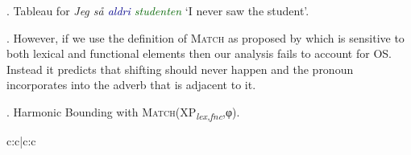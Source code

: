\documentclass[12pt, letterpaper]{article}
\begin{document}
\ex. \label{ex:noshifting} Tableau for \textit{Jeg så \textcolor{DarkBlue}{aldri} \textcolor{DarkGreen}{studenten}} `I never saw the student'.\\


\ex. However, if we use the definition of \textsc{Match} as proposed by \cite{elfnerSyntaxProsodyInteractionsIrish2012} which is sensitive to both lexical and functional elements then our analysis fails to account for OS. Instead it predicts that shifting should never happen and the pronoun incorporates into the adverb that is adjacent to it.

\ex. \label{ex:HBf} Harmonic Bounding with \textsc{Match}(XP\textsubscript{\textit{lex,fnc}},φ).\\
\begin{tableau}{c:c|c:c}
	      
	 \vio{}  \vio{***}    \vio{*}
	       \vio{}  \vio{*}
	   \vio{}  \vio{***}  \vio{}  \vio{*}
\end{tableau}
\end{document}
